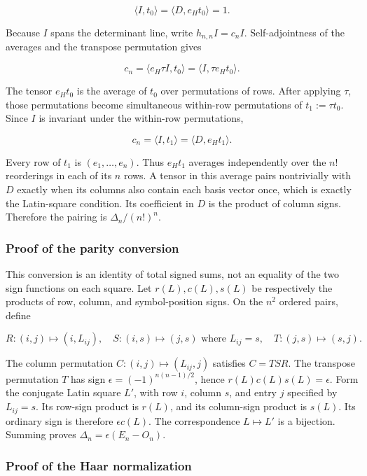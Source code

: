 \documentclass[
  10pt,
]{article}
\begin{document}
\[
\langle I,t_0\rangle=\langle D,e_Ht_0\rangle=1.
\tag{R-002a}
\]

Because \(I\) spans the determinant line, write \(h_{n,n}I=c_nI\).
Self-adjointness of the averages and the transpose permutation gives

\[
c_n=\langle e_H\tau I,t_0\rangle
=\langle I,\tau e_Ht_0\rangle.
\]

The tensor \(e_Ht_0\) is the average of \(t_0\) over permutations of
rows. After applying \(\tau\), those permutations become simultaneous
within-row permutations of \(t_1:=\tau t_0\). Since \(I\) is invariant
under the within-row permutations,

\[
c_n=\langle I,t_1\rangle=\langle D,e_Ht_1\rangle.
\]

Every row of \(t_1\) is \((e_1,\ldots,e_n)\). Thus \(e_Ht_1\) averages
independently over the \(n!\) reorderings in each of its \(n\) rows. A
tensor in this average pairs nontrivially with \(D\) exactly when its
columns also contain each basis vector once, which is exactly the
Latin-square condition. Its coefficient in \(D\) is the product of
column signs. Therefore the pairing is \(\Delta_n/(n!)^n\).

\subsubsection{Proof of the parity
conversion}\label{proof-of-the-parity-conversion}

This conversion is an identity of total signed sums, not an equality of
the two sign functions on each square. Let \(r(L),c(L),s(L)\) be
respectively the products of row, column, and symbol-position signs. On
the \(n^2\) ordered pairs, define

\[
R:(i,j)\mapsto(i,L_{ij}),\quad
S:(i,s)\mapsto(j,s)\text{ where }L_{ij}=s,
\quad T:(j,s)\mapsto(s,j).
\]

The column permutation \(C:(i,j)\mapsto(L_{ij},j)\) satisfies \(C=TSR\).
The transpose permutation \(T\) has sign \(\epsilon=(-1)^{n(n-1)/2}\),
hence \(r(L)c(L)s(L)=\epsilon\). Form the conjugate Latin square \(L'\),
with row \(i\), column \(s\), and entry \(j\) specified by \(L_{ij}=s\).
Its row-sign product is \(r(L)\), and its column-sign product is
\(s(L)\). Its ordinary sign is therefore \(\epsilon c(L)\). The
correspondence \(L\mapsto L'\) is a bijection. Summing proves
\(\Delta_n=\epsilon(E_n-O_n)\).

\subsubsection{Proof of the Haar
normalization}\label{proof-of-the-haar-normalization}
\end{document}
